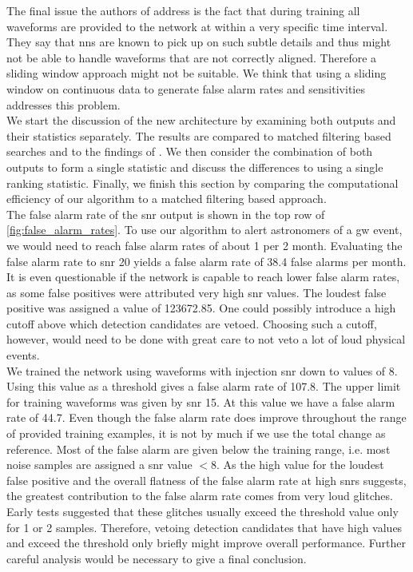 The final issue the authors of \cite{cnn_magiacal_bullet} address is the fact that during training all waveforms are provided to the network at within a very specific time interval. They say that \gls{nn}s are known to pick up on such subtle details and thus might not be able to handle waveforms that are not correctly aligned. Therefore a sliding window approach might not be suitable. We think that using a sliding window on continuous data to generate false alarm rates and sensitivities addresses this problem.\smallskip\\
We start the discussion of the new architecture by examining both outputs and their statistics separately. The results are compared to matched filtering based searches and to the findings of \cite{bns_network}. We then consider the combination of both outputs to form a single statistic and discuss the differences to using a single ranking statistic. Finally, we finish this section by comparing the computational efficiency of our algorithm to a matched filtering based approach.\smallskip\\
The false alarm rate of the \gls{snr} output is shown in the top row of \autoref{fig:false_alarm_rates}. To use our algorithm to alert astronomers of a \gls{gw} event, we would need to reach false alarm rates of about 1 per 2 month. Evaluating the false alarm rate to \gls{snr} 20 yields a false alarm rate of 38.4 false alarms per month. It is even questionable if the network is capable to reach lower false alarm rates, as some false positives were attributed very high \gls{snr} values. The loudest false positive was assigned a value of 123672.85. One could possibly introduce a high cutoff above which detection candidates are vetoed. Choosing such a cutoff, however, would need to be done with great care to not veto a lot of loud physical events.\\
We trained the network using waveforms with injection \gls{snr} down to values of $8$. Using this value as a threshold gives a false alarm rate of 107.8. The upper limit for training waveforms was given by \gls{snr} 15. At this value we have a false alarm rate of 44.7. Even though the false alarm rate does improve throughout the range of provided training examples, it is not by much if we use the total change as reference. Most of the false alarm are given below the training range, i.e. most noise samples are assigned a \gls{snr} value $<8$. As the high value for the loudest false positive and the overall flatness of the false alarm rate at high \gls{snr}s suggests, the greatest contribution to the false alarm rate comes from very loud glitches. Early tests suggested that these glitches usually exceed the threshold value only for 1 or 2 samples. Therefore, vetoing detection candidates that have high values and exceed the threshold only briefly might improve overall performance. Further careful analysis would be necessary to give a final conclusion.\\

